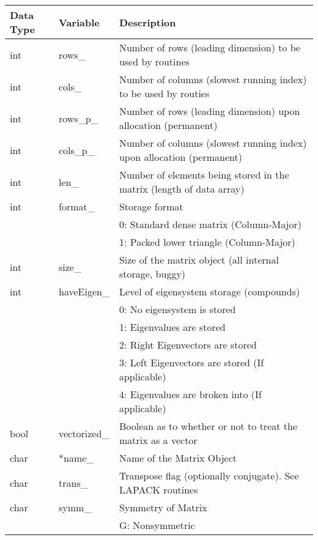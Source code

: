 \documentclass[english,journal=jctcce,manuscript=article,etalmode=truncate,maxauthors=0]{article}
\begin{document}
\begin{table}[h!]
\begin{tabular}{| l | l | l |}
\hline
\textbf{Data Type} & \textbf{Variable} & \textbf{Description}\\
\hline
int   &    rows\_             & Number of rows (leading dimension) to be used by routines\\
  int   &    cols\_             & Number of columns (slowest running index) to be used by routies\\
  int   &    rows\_p\_           & Number of rows (leading dimension) upon allocation (permanent)\\
  int   &    cols\_p\_           & Number of columns (slowest running index) upon allocation (permanent)\\
  int   &    len\_              & Number of elements being stored in the matrix (length of data array)\\
  int   &    format\_           & Storage format\\
        &                       &   0:  Standard dense matrix (Column-Major)\\
        &                       &   1:  Packed lower triangle (Column-Major)\\
  int   &    size\_             & Size of the matrix object (all internal storage, buggy)\\
  int   &    haveEigen\_        & Level of eigensystem storage (compounds)\\
        &                       &   0:  No eigensystem is stored\\
        &                       &   1:  Eigenvalues are stored\\
        &                       &   2:  Right Eigenvectors are stored\\
        &                       &   3:  Left Eigenvectors are stored  (If applicable)\\
        &                       &   4:  Eigenvalues are broken into   (If applicable)\\
  bool  &    vectorized\_      & Boolean as to whether or not to treat the matrix as a vector\\
  char  &    *name\_ & Name of the Matrix Object\\
  char  &    trans\_            & Transpose flag (optionally conjugate). See LAPACK routines\\
  char  &    symm\_             & Symmetry of Matrix\\
        &                       &   G: Nonsymmetric\\

\end{tabular}
\end{table}
\end{document}
